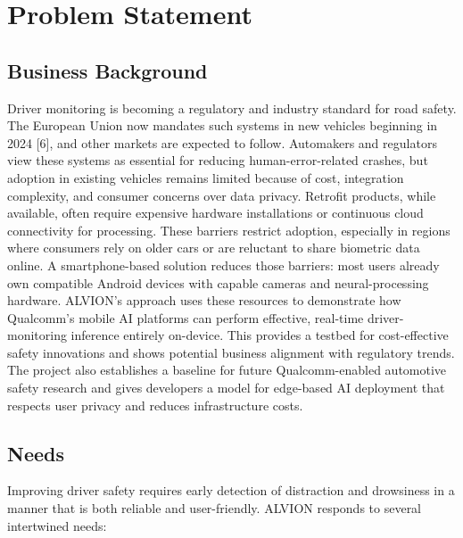 \documentclass[11pt]{report}
\begin{document}
\clearpage

\chapter{Problem Statement}


\section{Business Background}
Driver monitoring is becoming a regulatory and industry standard for road safety. The European Union now mandates such systems in new vehicles beginning in 2024 [6], and other markets are expected to follow. Automakers and regulators view these systems as essential for reducing human-error-related crashes, but adoption in existing vehicles remains limited because of cost, integration complexity, and consumer concerns over data privacy.
Retrofit products, while available, often require expensive hardware installations or continuous cloud connectivity for processing. These barriers restrict adoption, especially in regions where consumers rely on older cars or are reluctant to share biometric data online. A smartphone-based solution reduces those barriers: most users already own compatible Android devices with capable cameras and neural-processing hardware.
ALVION’s approach uses these resources to demonstrate how Qualcomm’s mobile AI platforms can perform effective, real-time driver-monitoring inference entirely on-device. This provides a testbed for cost-effective safety innovations and shows potential business alignment with regulatory trends. The project also establishes a baseline for future Qualcomm-enabled automotive safety research and gives developers a model for edge-based AI deployment that respects user privacy and reduces infrastructure costs.

\clearpage

\section{Needs}
Improving driver safety requires early detection of distraction and drowsiness in a manner that is both reliable and user-friendly. ALVION responds to several intertwined needs:
\end{document}

